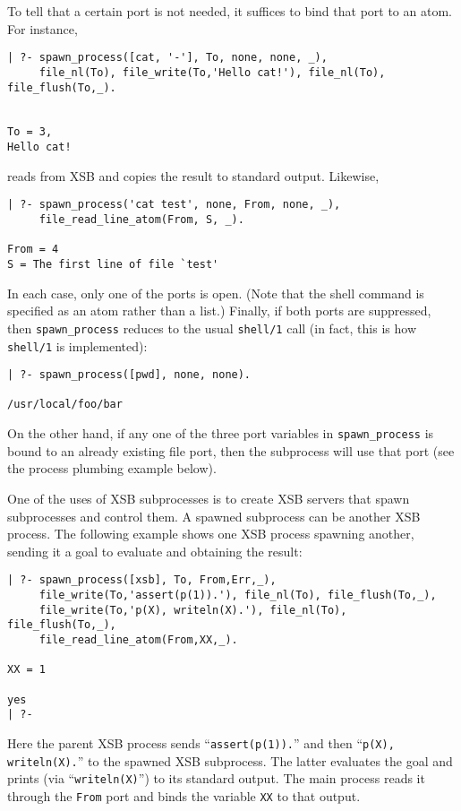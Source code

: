 To tell that a certain port is not needed, it suffices to bind that port to
an atom.  For instance,
\begin{verbatim}
| ?- spawn_process([cat, '-'], To, none, none, _),
     file_nl(To), file_write(To,'Hello cat!'), file_nl(To), file_flush(To,_).


To = 3,
Hello cat!
\end{verbatim}
reads from XSB and copies the result to standard output. Likewise,
\begin{verbatim}
| ?- spawn_process('cat test', none, From, none, _),
     file_read_line_atom(From, S, _).

From = 4
S = The first line of file `test'
\end{verbatim}
In each case, only one of the ports is open. (Note that the shell command
is specified as an atom rather than a list.) Finally, if both ports are
suppressed, then \verb|spawn_process| reduces to the usual
{\tt shell/1} call (in fact, this is how {\tt shell/1} is implemented):
\begin{verbatim}
| ?- spawn_process([pwd], none, none).

/usr/local/foo/bar
\end{verbatim}
On the other hand, if any one of the three port variables in
\verb|spawn_process| is bound to an already existing file port, then the
subprocess will use that port (see the process plumbing example below).

One of the uses of XSB subprocesses is to create XSB servers that spawn
subprocesses and control them. A spawned subprocess can be another XSB
process. The following example shows one XSB process spawning another,
sending it a goal to evaluate and obtaining the result:
\begin{verbatim}
| ?- spawn_process([xsb], To, From,Err,_),
     file_write(To,'assert(p(1)).'), file_nl(To), file_flush(To,_),
     file_write(To,'p(X), writeln(X).'), file_nl(To), file_flush(To,_), 
     file_read_line_atom(From,XX,_).  

XX = 1

yes
| ?-
\end{verbatim}
Here the parent XSB process sends ``\verb|assert(p(1)).|'' and then
``\verb|p(X), writeln(X).|'' to the spawned XSB subprocess. The latter
evaluates the goal and prints (via ``\verb|writeln(X)|'')
to its standard output. The main process reads it through the {\tt From}
port and binds the variable {\tt XX} to that output.

